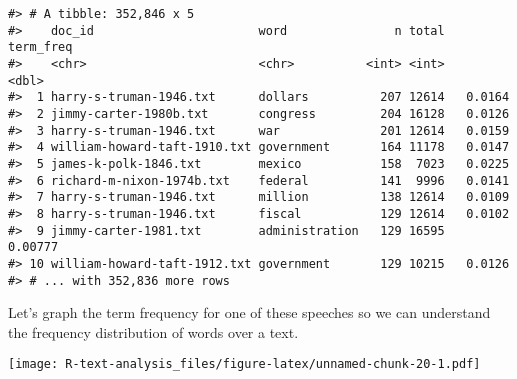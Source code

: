 \documentclass[]{book}
\newenvironment{Shaded}{\begin{snugshade}}{\end{snugshade}}
\newcommand{\DataTypeTok}[1]{\textcolor[rgb]{0.13,0.29,0.53}{#1}}
\newcommand{\FloatTok}[1]{\textcolor[rgb]{0.00,0.00,0.81}{#1}}
\newcommand{\KeywordTok}[1]{\textcolor[rgb]{0.13,0.29,0.53}{\textbf{#1}}}
\newcommand{\NormalTok}[1]{#1}
\newcommand{\OperatorTok}[1]{\textcolor[rgb]{0.81,0.36,0.00}{\textbf{#1}}}
\newcommand{\OtherTok}[1]{\textcolor[rgb]{0.56,0.35,0.01}{#1}}
\newcommand{\StringTok}[1]{\textcolor[rgb]{0.31,0.60,0.02}{#1}}
\begin{document}
\begin{Shaded}
\end{Shaded}

\begin{verbatim}
#> # A tibble: 352,846 x 5
#>    doc_id                       word               n total term_freq
#>    <chr>                        <chr>          <int> <int>     <dbl>
#>  1 harry-s-truman-1946.txt      dollars          207 12614   0.0164 
#>  2 jimmy-carter-1980b.txt       congress         204 16128   0.0126 
#>  3 harry-s-truman-1946.txt      war              201 12614   0.0159 
#>  4 william-howard-taft-1910.txt government       164 11178   0.0147 
#>  5 james-k-polk-1846.txt        mexico           158  7023   0.0225 
#>  6 richard-m-nixon-1974b.txt    federal          141  9996   0.0141 
#>  7 harry-s-truman-1946.txt      million          138 12614   0.0109 
#>  8 harry-s-truman-1946.txt      fiscal           129 12614   0.0102 
#>  9 jimmy-carter-1981.txt        administration   129 16595   0.00777
#> 10 william-howard-taft-1912.txt government       129 10215   0.0126 
#> # ... with 352,836 more rows
\end{verbatim}

Let's graph the term frequency for one of these speeches so we can understand the frequency distribution of words over a text.

\begin{Shaded}
\end{Shaded}

\texttt{[image: R-text-analysis\_files/figure-latex/unnamed-chunk-20-1.pdf]}
\end{document}
